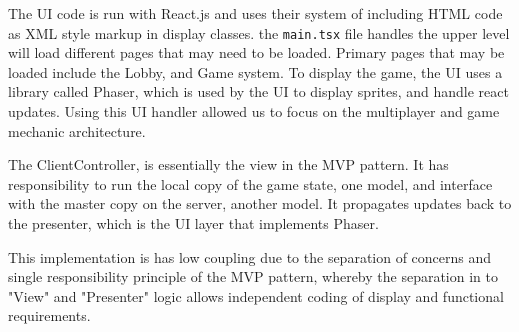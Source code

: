 \documentclass[12pt]{report}
\begin{document}
The UI code is run with React.js and uses their system of including HTML code as XML style markup in display classes. the \texttt{main.tsx} file handles the upper level will load different pages that may need to be loaded. Primary pages that may be loaded include the Lobby, and Game system. To display the game, the UI uses a library called Phaser, which is used by the UI to display sprites, and handle react updates. Using this UI handler allowed us to focus on the multiplayer and game mechanic architecture. 

The ClientController, is essentially the view in the MVP pattern. It has responsibility to run the local copy of the game state, one model, and interface with the master copy on the server, another model. It propagates updates back to the presenter, which is the UI layer that implements Phaser. 

This implementation is has low coupling due to the separation of concerns and single responsibility principle of the MVP pattern, whereby the separation in to "View" and "Presenter" logic allows independent coding of display and functional requirements. 




\end{document}
